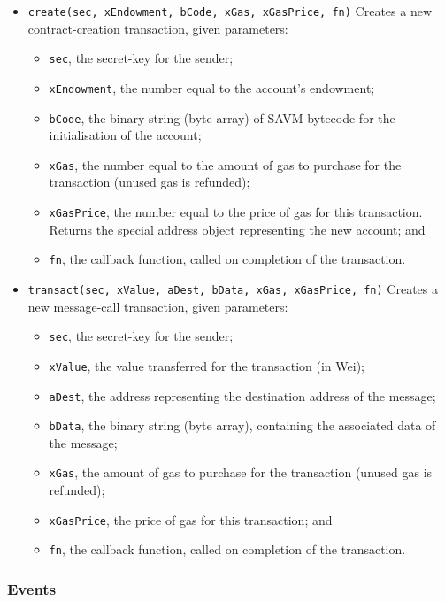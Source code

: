 \begin{itemize}
\item \texttt{create(sec, xEndowment, bCode, xGas, xGasPrice, fn)} Creates a new contract-creation transaction, given parameters:
\begin{itemize}
\item \texttt{sec}, the secret-key for the sender;
\item \texttt{xEndowment}, the number equal to the account's endowment;
\item \texttt{bCode}, the binary string (byte array) of SAVM-bytecode for the initialisation of the account;
\item \texttt{xGas}, the number equal to the amount of gas to purchase for the transaction (unused gas is refunded);
\item \texttt{xGasPrice}, the number equal to the price of gas for this transaction. Returns the special address object representing the new account; and
\item \texttt{fn}, the callback function, called on completion of the transaction.
\end{itemize}
\item \texttt{transact(sec, xValue, aDest, bData, xGas, xGasPrice, fn)} Creates a new message-call transaction, given parameters:
\begin{itemize}
\item \texttt{sec}, the secret-key for the sender;
\item \texttt{xValue}, the value transferred for the transaction (in Wei);
\item \texttt{aDest}, the address representing the destination address of the message;
\item \texttt{bData}, the binary string (byte array), containing the associated data of the message;
\item \texttt{xGas}, the amount of gas to purchase for the transaction (unused gas is refunded);
\item \texttt{xGasPrice}, the price of gas for this transaction; and
\item \texttt{fn}, the callback function, called on completion of the transaction.
\end{itemize}
\end{itemize}

\subsubsection{Events}

